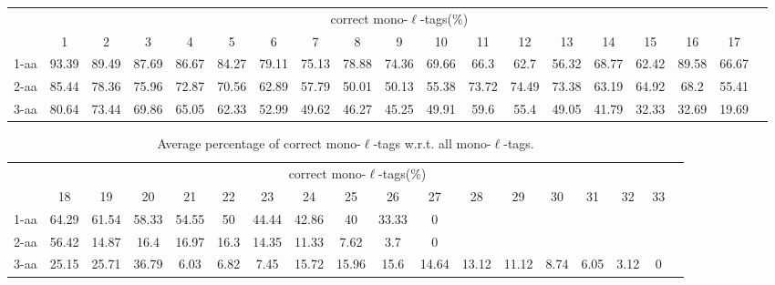 \documentclass{article}
\begin{document}
\begin{table}[h]\tiny
\vspace{3mm}
{\centering
\begin{center}
\begin{tabular}{|l|c|c|c|c|c|c|c|c|c|c|c|c|c|c|c|c|c|c|}
  \hline
  & \multicolumn{ 17 }{|c|}{correct mono-$\ell$-tags(\%)} \\
  \cline{2- 18}
    & 1 & 2 & 3 & 4 & 5 & 6 & 7 & 8 & 9 & 10 & 11 & 12 & 13 & 14 & 15 & 16 & 17\\
  \hline
1-aa  & 93.39 & 89.49 & 87.69 & 86.67 & 84.27 & 79.11 & 75.13 & 78.88 & 74.36 & 69.66 & 66.3 & 62.7 & 56.32 & 68.77 & 62.42 & 89.58 & 66.67\\
2-aa  & 85.44 & 78.36 & 75.96 & 72.87 & 70.56 & 62.89 & 57.79 & 50.01 & 50.13 & 55.38 & 73.72 & 74.49 & 73.38 & 63.19 & 64.92 & 68.2 & 55.41\\
3-aa  & 80.64 & 73.44 & 69.86 & 65.05 & 62.33 & 52.99 & 49.62 & 46.27 & 45.25 & 49.91 & 59.6 & 55.4 & 49.05 & 41.79 & 32.33 & 32.69 & 19.69\\
 \hline
\end{tabular}
\end{center}
\par}
\centering

\vspace{3mm}
\label{table:table8}
\end{table}
\begin{table}[h]\tiny
\vspace{3mm}
{\centering
\begin{center}
\begin{tabular}{|l|c|c|c|c|c|c|c|c|c|c|c|c|c|c|c|c|c|}
  \hline
  & \multicolumn{ 16 }{|c|}{correct mono-$\ell$-tags(\%)} \\
  \cline{2- 17}
    & 18 & 19 & 20 & 21 & 22 & 23 & 24 & 25 & 26 & 27 & 28 & 29 & 30 & 31 & 32 & 33\\
  \hline
1-aa  & 64.29 & 61.54 & 58.33 & 54.55 & 50 & 44.44 & 42.86 & 40 & 33.33 & 0 &  &  &  &  &  & \\
2-aa  & 56.42 & 14.87 & 16.4 & 16.97 & 16.3 & 14.35 & 11.33 & 7.62 & 3.7 & 0 &  &  &  &  &  & \\
3-aa  & 25.15 & 25.71 & 36.79 & 6.03 & 6.82 & 7.45 & 15.72 & 15.96 & 15.6 & 14.64 & 13.12 & 11.12 & 8.74 & 6.05 & 3.12 & 0\\
 \hline
\end{tabular}
\end{center}
\par}
\centering

\caption{ Average percentage of correct mono-$\ell$-tags w.r.t. all mono-$\ell$-tags.}

\vspace{3mm}
\label{table:table8}
\end{table}
\end{document}
